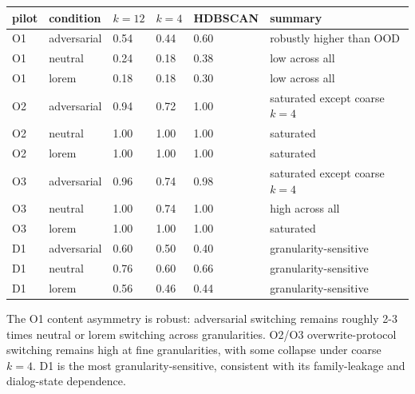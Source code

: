 \documentclass{article}
\theoremstyle{plain}
\theoremstyle{definition}
\begin{document}
\begin{table}[h!]
\centering
\small
\begin{tabularx}{\textwidth}{lYYYYY}
\toprule
pilot & condition & $k=12$ & $k=4$ & HDBSCAN & summary \\
\midrule
O1 & adversarial & 0.54 & 0.44 & 0.60 & robustly higher than OOD \\
O1 & neutral & 0.24 & 0.18 & 0.38 & low across all \\
O1 & lorem & 0.18 & 0.18 & 0.30 & low across all \\
O2 & adversarial & 0.94 & 0.72 & 1.00 & saturated except coarse $k=4$ \\
O2 & neutral & 1.00 & 1.00 & 1.00 & saturated \\
O2 & lorem & 1.00 & 1.00 & 1.00 & saturated \\
O3 & adversarial & 0.96 & 0.74 & 0.98 & saturated except coarse $k=4$ \\
O3 & neutral & 1.00 & 0.74 & 1.00 & high across all \\
O3 & lorem & 1.00 & 1.00 & 1.00 & saturated \\
D1 & adversarial & 0.60 & 0.50 & 0.40 & granularity-sensitive \\
D1 & neutral & 0.76 & 0.60 & 0.66 & granularity-sensitive \\
D1 & lorem & 0.56 & 0.46 & 0.44 & granularity-sensitive \\
\bottomrule
\end{tabularx}
\end{table}

The O1 content asymmetry is robust: adversarial switching remains roughly 2-3 times neutral or lorem switching across granularities. O2/O3 overwrite-protocol switching remains high at fine granularities, with some collapse under coarse $k=4$. D1 is the most granularity-sensitive, consistent with its family-leakage and dialog-state dependence.
\end{document}
